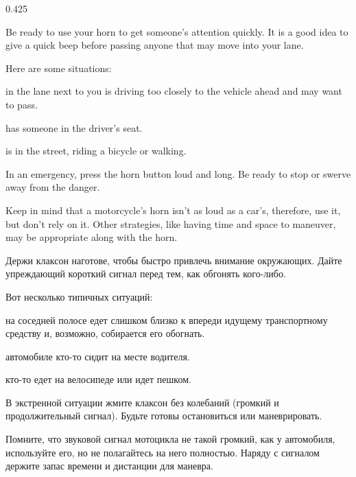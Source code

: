 \begin{langblock}{0.425}
	\begin{eng}
	
	Be ready to use your horn to get someone's attention quickly.  It is a good idea to give a quick beep before passing anyone that may move into your lane.
	
	Here are some situations:
	
	\begin{description} [noitemsep]
		\item [A driver] in the lane next to you is driving too closely to the vehicle ahead and may want to pass.
		\item [A parked car] has someone in the driver's seat.
		\item [Someone] is in the street, riding a bicycle or walking.
	\end{description}
	
	In an emergency, press the horn button loud and long. Be ready to stop or swerve away from the danger.
	
	Keep in mind that a motorcycle's horn isn't as loud as a car's, therefore, use it, but don't rely on it.  Other strategies, like having time and space to maneuver, may be appropriate along with the horn.
	\end{eng}
	\begin{rus}
		
		Держи клаксон наготове, чтобы быстро привлечь внимание окружающих. Дайте упреждающий короткий сигнал перед тем, как обгонять кого-либо.
		
		Вот несколько типичных ситуаций:
		
		\begin{description} [noitemsep]
			\item [Водитель] на соседней полосе едет слишком близко к впереди идущему транспортному средству и, возможно, собирается его обогнать.
			\item [В припаркованном] автомобиле кто-то сидит на месте водителя.
			\item [По улице] кто-то едет на велосипеде или идет пешком.
		\end{description}
		
		В экстренной ситуации жмите клаксон без колебаний (громкий и продолжительный сигнал). Будьте готовы остановиться или маневрировать.
		
		Помните, что звуковой сигнал мотоцикла не такой громкий, как у автомобиля, используйте его, но не полагайтесь на него полностью. Наряду с сигналом держите запас времени и дистанции для маневра.
\end{rus}
\end{langblock}


